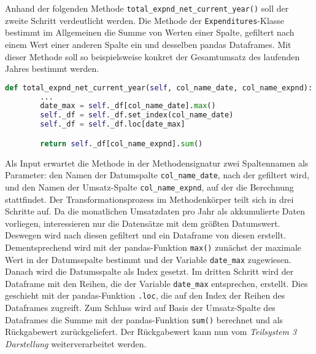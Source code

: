
    

    Anhand der folgenden Methode \texttt{total\_expnd\_net\_current\_year()} soll der zweite Schritt verdeutlicht werden.
    Die Methode der \texttt{Expenditures}-Klasse bestimmt im Allgemeinen die Summe von Werten einer Spalte, gefiltert
    nach einem Wert einer anderen Spalte ein und desselben pandas Dataframes. Mit dieser Methode soll so beispielsweise konkret der Gesamtumsatz des 
    laufenden Jahres bestimmt werden.

    \begin{lstlisting}[language=Python, caption=Beispiel Methode Expenditures class]
    def total_expnd_net_current_year(self, col_name_date, col_name_expnd):
        ... 
        date_max = self._df[col_name_date].max()        
        self._df = self._df.set_index(col_name_date)
        self._df = self._df.loc[date_max]

        return self._df[col_name_expnd].sum()  
    \end{lstlisting}

    Als Input erwartet die Methode in der Methodensignatur zwei Spaltennamen als Parameter: den Namen der Datumspalte \texttt{col\_name\_date}, nach der gefiltert wird,
    und den Namen der Umsatz-Spalte \texttt{col\_name\_expnd}, auf der die Berechnung stattfindet. Der Transformationsprozess im Methodenkörper teilt sich in drei Schritte auf. Da die monatlichen Umsatzdaten pro Jahr als 
    akkumulierte Daten vorliegen, interessieren nur die Datensätze mit dem größten Datumswert. Deswegen
    wird nach diesen gefiltert und ein Dataframe von diesen erstellt. Dementsprechend wird mit der pandas-Funktion \texttt{max()} 
    zunächst der maximale Wert in der Datumsspalte bestimmt und der Variable \texttt{date\_max} zugewiesen. Danach wird die Datumsspalte als Index gesetzt. 
    Im dritten Schritt wird der Dataframe mit den Reihen, die der Variable \texttt{date\_max} entsprechen, erstellt. Dies geschieht mit der pandas-Funktion \texttt{.loc}, die
    auf den Index der Reihen des Dataframes zugreift. Zum Schluss wird auf Basis der Umsatz-Spalte des Dataframes die Summe mit der pandas-Funktion \texttt{sum()} berechnet 
    und als Rückgabewert zurückgeliefert. Der Rückgabewert kann nun vom \textit{Teilsystem 3 Darstellung} weiterverarbeitet werden.\\

